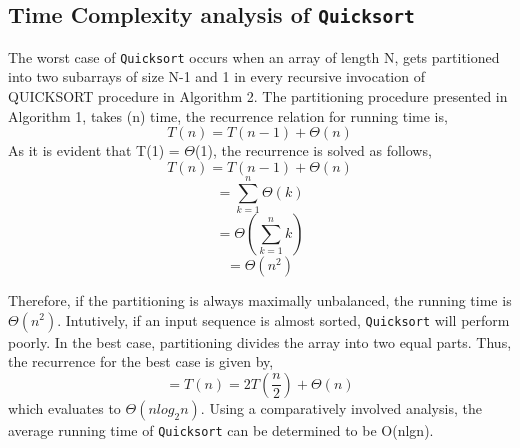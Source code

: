 \documentclass{article}
\begin{document}
\begin{multicols}{2}
\subsection{Time Complexity analysis of \texttt{Quicksort}}
The worst case of \texttt{Quicksort} occurs when an array of length N, gets partitioned into two subarrays
of size N-1 and 1 in every recursive invocation of
QUICKSORT procedure in Algorithm 2. The partitioning procedure presented in Algorithm 1, takes
(n) time, the recurrence relation for running time
is,\\
\begin{equation*}
T(n) = T(n-1) + \Theta(n) 
\end{equation*}
As it is evident that T(1) = $\Theta$(1), the recurrence is
solved as follows,
\begin{equation*}
T(n) = T(n-1) + \Theta(n)
\end{equation*}
\begin{equation*}
=\sum_{k=1}^{n} \Theta(k)
\end{equation*}
\begin{equation*}
=\Theta(\sum_{k=1}^{n} k)
\end{equation*}
\begin{equation*}
=\Theta(n^{2})
\end{equation*}
\par
Therefore, if the partitioning is always maximally
unbalanced, the running time is $\Theta(n^{2})$. Intutively,
if an input sequence is almost sorted, \texttt{Quicksort}
will perform poorly. In the best case, partitioning
divides the array into two equal parts. Thus, the
recurrence for the best case is given by,
\begin{equation*}
=T(n) = 2T(\frac{n}{2}) + \Theta(n)
\end{equation*}
which evaluates to $\Theta(n log_{2} n)$. Using a comparatively involved analysis, the average running time
of \texttt{Quicksort} can be determined to be O(nlgn).
\end{multicols}
\newpage
\end{document}
